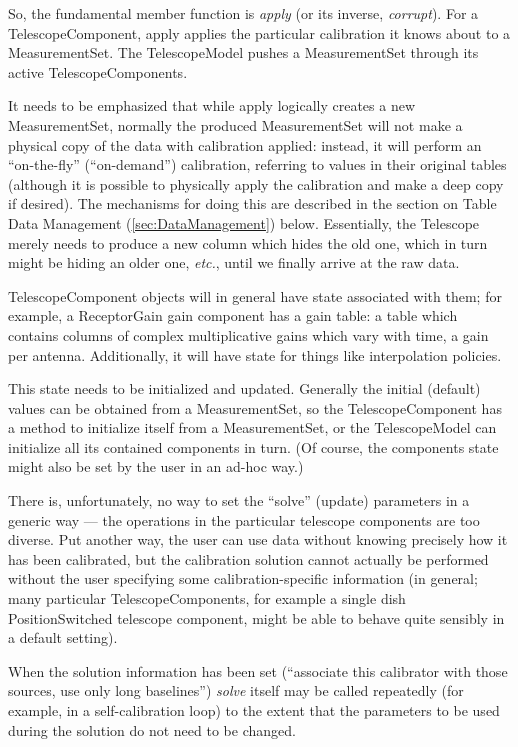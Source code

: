 So, the fundamental member function is {\em apply} (or its inverse,
{\em corrupt}). For a TelescopeComponent, apply applies the particular
calibration it knows about to a MeasurementSet. The TelescopeModel
pushes a MeasurementSet through its active TelescopeComponents.

It needs to be emphasized that while apply logically creates a new
MeasurementSet, normally the produced MeasurementSet will not make a
physical copy of the data with calibration applied: instead, it will
perform an ``on-the-fly'' (``on-demand'') calibration, referring to
values in their original tables (although it is possible to physically
apply the calibration and make a deep copy if desired). The mechanisms
for doing this are described in the section on Table Data Management
(\ref{sec:DataManagement}) below. Essentially, the Telescope merely
needs to produce a new column which hides the old one, which in turn
might be hiding an older one, {\em etc.}, until we finally arrive at
the raw data.

TelescopeComponent objects will in general have state associated with
them; for example, a ReceptorGain gain component has a gain table: a
table which contains columns of complex multiplicative gains which
vary with time, a gain per antenna. Additionally, it will have state
for things like interpolation policies.

This state needs to be initialized and updated. Generally the initial
(default) values can be obtained from a MeasurementSet, so the
TelescopeComponent has a method to initialize itself from a
MeasurementSet, or the TelescopeModel can initialize all its contained
components in turn. (Of course, the components state might also be set
by the user in an ad-hoc way.)

There is, unfortunately, no way to set the ``solve'' (update)
parameters in a generic way --- the operations in the particular
telescope components are too diverse. Put another way, the user can
use data without knowing precisely how it has been calibrated, but the
calibration solution cannot actually be performed without the user
specifying some calibration-specific information (in general; many
particular TelescopeComponents, for example a single dish
PositionSwitched telescope component, might be able to behave quite
sensibly in a default setting).

When the solution information has been set (``associate this
calibrator with those sources, use only long baselines'') {\em solve}
itself may be called repeatedly (for example, in a self-calibration
loop) to the extent that the parameters to be used during the solution
do not need to be changed.

